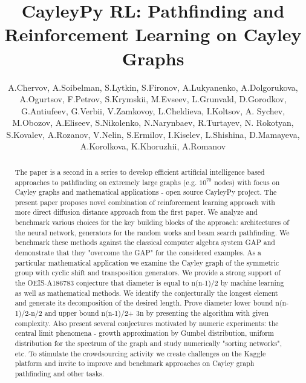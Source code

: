 \documentclass[atmp]{ipart_v1}
\numberwithin{equation}{section}
\theoremstyle{plain}%
\begin{document}
\title[CayleyPY RL]{CayleyPy RL: Pathfinding and Reinforcement Learning on Cayley Graphs}


\author[A.Chervov,A.Soibelman,... ]{A.Chervov, 
A.Soibelman, S.Lytkin, S.Fironov, A.Lukyanenko, A.Dolgorukova, A.Ogurtsov,
F.Petrov, S.Krymskii, M.Evseev, L.Grunvald, D.Gorodkov, G.Antiufeev, G.Verbii, 
V.Zamkovoy, L.Cheldieva, I.Koltsov, A. Sychev, M.Obozov, 
A.Eliseev, S.Nikolenko, N.Narynbaev, R.Turtayev,
N. Rokotyan, S.Kovalev,
A.Rozanov, V.Nelin, S.Ermilov,
I.Kiselev, L.Shishina, D.Mamayeva, A.Korolkova,
K.Khoruzhii, A.Romanov }

\begin{abstract}


The paper is a second in a series to develop efficient artificial intelligence based approaches to pathfinding on extremely large graphs (e.g. $10^{70}$ nodes) with focus on Cayley graphs and mathematical applications - open source CayleyPy project. The present paper proposes novel  combination of reinforcement learning approach with more direct diffusion distance approach from the first paper.  We analyze and benchmark various choices for the key building blocks of the approach:  architectures of the neural network, generators for the random works and beam search pathfinding. We benchmark these methods against the classical computer algebra system GAP and demonstrate that they  "overcome the GAP" for the considered examples.
As a particular mathematical application we examine the Cayley graph of the symmetric group with cyclic shift and transposition  generators. We provide a strong support of the OEIS-A186783 conjecture that diameter is equal to n(n-1)/2 by machine learning as well as mathematical methods. We identify the conjecturally the longest element and generate its decomposition of the desired length. Prove diameter lower bound n(n-1)/2-n/2 and upper bound n(n-1)/2+ 3n by presenting the algorithm with given complexity. Also present several conjectures motivated by numeric experiments:   the central limit phenomena - growth approximation by Gumbel distribution, uniform distribution for the spectrum of the graph and study numerically  "sorting networks", etc. 
To stimulate the crowdsourcing activity we create challenges on the Kaggle platform and invite to improve and benchmark approaches on Cayley graph pathfinding and other tasks.



\end{abstract}
\end{document}
